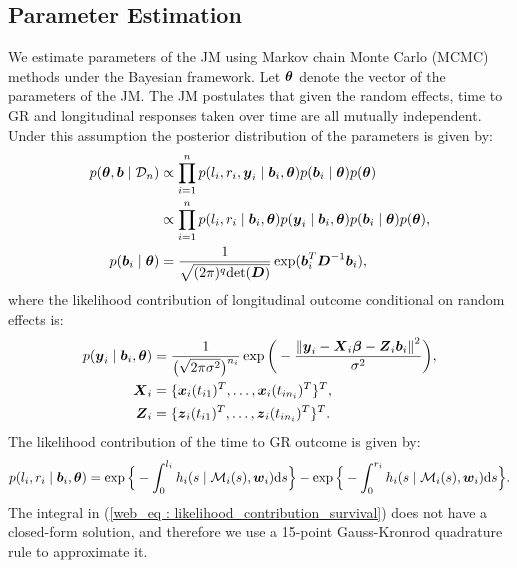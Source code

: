 \clearpage

\subsection{Parameter Estimation}
We estimate parameters of the JM using Markov chain Monte Carlo (MCMC) methods under the Bayesian framework. Let $\boldsymbol{\theta}$ denote the vector of the parameters of the JM. The JM postulates that given the random effects, time to GR and longitudinal responses taken over time are all mutually independent. Under this assumption the posterior distribution of the parameters is given by:
\begin{align*}
p(\boldsymbol{\theta}, \boldsymbol{b} \mid \mathcal{D}_n) & \propto \prod_{i=1}^n p(l_i, r_i, \boldsymbol{y}_i \mid \boldsymbol{b}_i, \boldsymbol{\theta}) p(\boldsymbol{b}_i \mid \boldsymbol{\theta}) p(\boldsymbol{\theta})\\
& \propto \prod_{i=1}^n p(l_i, r_i \mid \boldsymbol{b}_i, \boldsymbol{\theta}) p(\boldsymbol{y}_i \mid \boldsymbol{b}_i, \boldsymbol{\theta}) p(\boldsymbol{b}_i \mid \boldsymbol{\theta}) p(\boldsymbol{\theta}),\\
p(\boldsymbol{b}_i \mid \boldsymbol{\theta}) &= \frac{1}{\sqrt{(2 \pi)^q \text{det}(\boldsymbol{D})}} \exp(\boldsymbol{b}_i^T \boldsymbol{D}^{-1} \boldsymbol{b}_i),
\end{align*}
where the likelihood contribution of longitudinal outcome conditional on random effects is:
\begin{align*}
p(\boldsymbol{y}_i \mid \boldsymbol{b}_i, \boldsymbol{\theta}) &= \frac{1}{\big(\sqrt{2 \pi \sigma^2}\big)^{n_i}} \exp\bigg(-\frac{{\lVert{\boldsymbol{y}_i - \boldsymbol{X}_i\boldsymbol{\beta} - \boldsymbol{Z}_i\boldsymbol{b}_i}\rVert}^2}{\sigma^2}\bigg),\\
\boldsymbol{X}_i &= \{\boldsymbol{x}_i(t_{i1})^T, \ldots, \boldsymbol{x}_i(t_{in_i})^T\}^T,\\
\boldsymbol{Z}_i &= \{\boldsymbol{z}_i(t_{i1})^T, \ldots, \boldsymbol{z}_i(t_{in_i})^T\}^T.
\end{align*}
The likelihood contribution of the time to GR outcome is given by:
\begin{equation}
\label{web_eq : likelihood_contribution_survival}
p(l_i,r_i\mid \bmath{b}_i,\bmath{\theta}) = \exp\Big\{-\int_0^{l_i} h_i(s \mid \mathcal{M}_i(s), \bmath{w}_i)\rmn{d}{s}\Big\} - \exp\Big\{-\int_0^{r_i}h_i(s \mid \mathcal{M}_i(s), \bmath{w}_i)\rmn{d}{s}\Big\}.
\end{equation}
The integral in (\ref{web_eq : likelihood_contribution_survival}) does not have a closed-form solution, and therefore we use a 15-point Gauss-Kronrod quadrature rule to approximate it.

